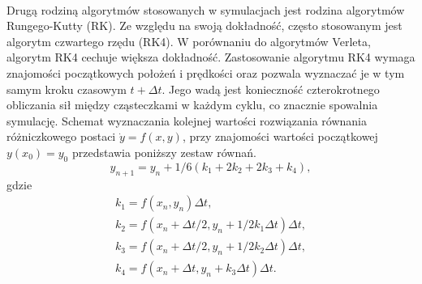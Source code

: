 \documentclass[12pt,a4paper,openright]{report} %
\begin{document}
\\
Drugą rodziną algorytmów stosowanych w symulacjach jest rodzina algorytmów Rungego-Kutty (RK). Ze względu na swoją dokładność, często stosowanym jest algorytm czwartego rzędu (RK4). W porównaniu do algorytmów Verleta, algorytm RK4 cechuje większa dokładność. Zastosowanie algorytmu RK4 wymaga znajomości początkowych położeń i prędkości oraz pozwala wyznaczać je w tym samym kroku czasowym $t+\Delta t$. Jego wadą jest konieczność czterokrotnego obliczania sił między cząsteczkami w każdym cyklu, co znacznie spowalnia symulację. Schemat wyznaczania kolejnej wartości rozwiązania równania różniczkowego postaci $\dot{y}=f(x,y)$, przy znajomości wartości początkowej $y(x_0)=y_0$ przedstawia poniższy zestaw równań.
\begin{equation}
y_{n+1} = y_n + 1/6 (k_1 + 2k_2 + 2k_3 + k_4),
\end{equation}
gdzie
\begin{equation}
\begin{gathered}
k_1=f(x_n, y_n)\Delta t,\\
%
k_2=f(x_n+\Delta t/2,y_n+1/2 k_1 \Delta t)\Delta t,\\
%
k_3=f(x_n+\Delta t/2,y_n+1/2 k_2 \Delta t)\Delta t,\\
%
k_4=f(x_n+\Delta t,y_n+ k_3 \Delta t)\Delta t.
\end{gathered}
\end{equation}
 
%
\end{document}
